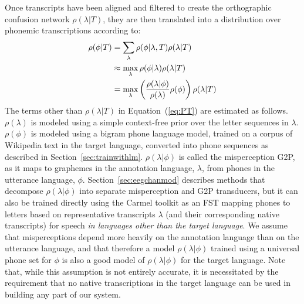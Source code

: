 Once transcripts have
been aligned and filtered to create the orthographic confusion network
$\rho(\lambda|T)$, they are then translated into a distribution over
phonemic transcriptions according to:
\begin{align}
  \rho(\phi|T) &=
  \sum_{\lambda} \rho(\phi|\lambda,T) \rho(\lambda|T) \notag \\
  &\approx \max_{\lambda}  \rho(\phi|\lambda) \rho(\lambda|T) \notag \\
  &= \max_{\lambda}  \left(\frac{\rho(\lambda|\phi)}{\rho(\lambda)}
  \rho(\phi)\right) \rho(\lambda|T) 
\label{eq:PT}
\end{align}
The terms other than $\rho(\lambda|T)$ in Equation~(\ref{eq:PT}) are
estimated as follows.  $\rho(\lambda)$ is modeled using a simple
context-free prior over the letter sequences in $\lambda$.
$\rho(\phi)$ is modeled using a bigram phone language model, trained
on a corpus of Wikipedia text in the target language, converted into
phone sequences as described in Section~\ref{sec:trainwithlm}.
$\rho(\lambda|\phi)$ is called the misperception G2P, as it maps to
graphemes in the annotation language, $\lambda$, from phones in the
utterance language, $\phi$.  Section~\ref{sec:eegchanmod} describes
methods that decompose $\rho(\lambda|\phi)$ into separate
misperception and G2P transducers, but it can also be trained directly
using the Carmel toolkit \cite{Knight99} as an FST mapping phones to
letters based on representative transcripts $\lambda$ (and their
corresponding native transcripts) for speech {\em in languages other
  than the target language}. We assume that misperceptions depend more
heavily on the annotation language than on the utterance language, and
that therefore a model $\rho(\lambda|\phi)$ trained using a universal
phone set for $\phi$ is also a good model of $\rho(\lambda|\phi)$ for
the target language. Note that, while this assumption is not entirely
accurate, it is necessitated by the requirement that no native
transcriptions in the target language can be used in building any part
of our system.


